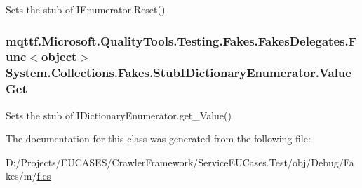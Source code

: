Sets the stub of I\-Enumerator.\-Reset()

\hypertarget{class_system_1_1_collections_1_1_fakes_1_1_stub_i_dictionary_enumerator_a7c6ce2a4da7d8f272e2951af8fa3477a}{
\subsubsection[{Value\-Get}]{\setlength{\rightskip}{0pt plus 5cm}mqttf.\-Microsoft.\-Quality\-Tools.\-Testing.\-Fakes.\-Fakes\-Delegates.\-Func$<$object$>$ System.\-Collections.\-Fakes.\-Stub\-I\-Dictionary\-Enumerator.\-Value\-Get}}\label{class_system_1_1_collections_1_1_fakes_1_1_stub_i_dictionary_enumerator_a7c6ce2a4da7d8f272e2951af8fa3477a}


Sets the stub of I\-Dictionary\-Enumerator.\-get\-\_\-\-Value()



The documentation for this class was generated from the following file\-:\begin{DoxyCompactItemize}
\item 
D\-:/\-Projects/\-E\-U\-C\-A\-S\-E\-S/\-Crawler\-Framework/\-Service\-E\-U\-Cases.\-Test/obj/\-Debug/\-Fakes/m/\hyperlink{m_2f_8cs}{f.\-cs}\end{DoxyCompactItemize}

